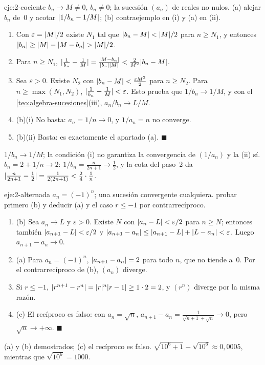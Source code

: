 \begin{solucion}{eje:2-cociente}
\datos $b_n\to M\ne0$, $b_n\ne0$; la sucesión $(a_n)$ de reales no nulos.
\planteamiento (a) alejar $b_n$ de~0 y acotar $\lvert1/b_n-1/M\rvert$; (b) contraejemplo en (i) y (a) en (ii).
\pasos
\begin{enumerate}[label=\arabic*.]
  \item Con $\varepsilon=\lvert M\rvert/2$ existe $N_1$ tal que $\lvert b_n-M\rvert<\lvert M\rvert/2$ para $n\ge N_1$, y entonces $\lvert b_n\rvert\ge\lvert M\rvert-\lvert M-b_n\rvert>\lvert M\rvert/2$.
  \item Para $n\ge N_1$, $\lvert\frac1{b_n}-\frac1M\rvert=\frac{\lvert M-b_n\rvert}{\lvert b_n\rvert\lvert M\rvert}<\frac{2}{M^{2}}\lvert b_n-M\rvert$.
  \item Sea $\varepsilon>0$. Existe $N_2$ con $\lvert b_n-M\rvert<\frac{\varepsilon M^{2}}{2}$ para $n\ge N_2$. Para $n\ge\max(N_1,N_2)$, $\lvert\frac1{b_n}-\frac1M\rvert<\varepsilon$. Esto prueba que $1/b_n\to1/M$, y con el \cref{teo:algebra-sucesiones}(iii), $a_n/b_n\to L/M$.
  \item (b)(i) No basta: $a_n=1/n\to0$, y $1/a_n=n$ no converge.
  \item (b)(ii) Basta: es exactamente el apartado (a). \hfill$\blacksquare$
\end{enumerate}
\resultado $1/b_n\to1/M$; la condición (i) no garantiza la convergencia de $(1/a_n)$ y la (ii) sí.
\comprobacion $b_n=2+1/n\to2$: $1/b_n=\frac{n}{2n+1}\to\frac12$, y la cota del paso~2 da $\lvert\frac{n}{2n+1}-\frac12\rvert=\frac{1}{2(2n+1)}<\frac{2}{4}\cdot\frac1n$.
\end{solucion}

\begin{solucion}{eje:2-alternada}
\datos $a_n=(-1)^{n}$; una sucesión convergente cualquiera.
\planteamiento probar primero (b) y deducir (a) y el caso $r\le-1$ por contrarrecíproco.
\pasos
\begin{enumerate}[label=\arabic*.]
  \item (b) Sea $a_n\to L$ y $\varepsilon>0$. Existe $N$ con $\lvert a_n-L\rvert<\varepsilon/2$ para $n\ge N$; entonces también $\lvert a_{n+1}-L\rvert<\varepsilon/2$ y $\lvert a_{n+1}-a_n\rvert\le\lvert a_{n+1}-L\rvert+\lvert L-a_n\rvert<\varepsilon$. Luego $a_{n+1}-a_n\to0$.
  \item (a) Para $a_n=(-1)^{n}$, $\lvert a_{n+1}-a_n\rvert=2$ para todo $n$, que no tiende a~0. Por el contrarrecíproco de (b), $(a_n)$ diverge.
  \item Si $r\le-1$, $\lvert r^{n+1}-r^{n}\rvert=\lvert r\rvert^{n}\lvert r-1\rvert\ge1\cdot2=2$, y $(r^{n})$ diverge por la misma razón.
  \item (c) El recíproco es falso: con $a_n=\sqrt n$, $a_{n+1}-a_n=\frac{1}{\sqrt{n+1}+\sqrt n}\to0$, pero $\sqrt n\to+\infty$. \hfill$\blacksquare$
\end{enumerate}
\resultado (a) y (b) demostrados; (c) el recíproco es falso.
\comprobacion $\sqrt{10^{6}+1}-\sqrt{10^{6}}\approx0{,}0005$, mientras que $\sqrt{10^{6}}=1000$.
\end{solucion}

